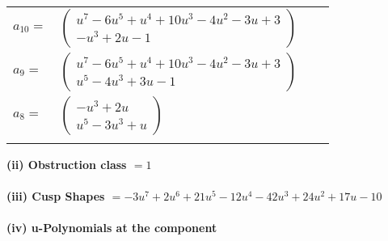 \documentclass[1p]{elsarticle_modified}
\theoremstyle{definition}
\begin{document}
\begin{tabular}{m{7pt} m{180pt} m{7pt} m{180pt} }
\flushright $a_{10}=$&$\begin{pmatrix}u^7-6 u^5+u^4+10 u^3-4 u^2-3 u+3\\- u^3+2 u-1\end{pmatrix}$ \\
\flushright $a_{9}=$&$\begin{pmatrix}u^7-6 u^5+u^4+10 u^3-4 u^2-3 u+3\\u^5-4 u^3+3 u-1\end{pmatrix}$ \\
\flushright $a_{8}=$&$\begin{pmatrix}- u^3+2 u\\u^5-3 u^3+u\end{pmatrix}$\\&\end{tabular}
\flushleft \textbf{(ii) Obstruction class $= 1$}\\~\\
\flushleft \textbf{(iii) Cusp Shapes $= -3 u^7+2 u^6+21 u^5-12 u^4-42 u^3+24 u^2+17 u-10$}\\~\\
\newpage\renewcommand{\arraystretch}{1}
\flushleft \textbf{(iv) u-Polynomials at the component}\newline \\
\end{document}
